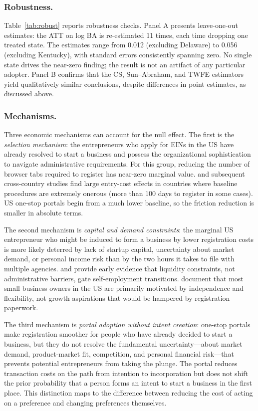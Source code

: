 \documentclass[12pt]{article}
\begin{document}
\subsubsection*{Robustness.}
Table~\ref{tab:robust} reports robustness checks. Panel A presents leave-one-out estimates: the ATT on log BA is re-estimated 11 times, each time dropping one treated state. The estimates range from 0.012 (excluding Delaware) to 0.056 (excluding Kentucky), with standard errors consistently spanning zero. No single state drives the near-zero finding; the result is not an artifact of any particular adopter. Panel B confirms that the CS, Sun--Abraham, and TWFE estimators yield qualitatively similar conclusions, despite differences in point estimates, as discussed above.




\subsubsection*{Mechanisms.}
Three economic mechanisms can account for the null effect. The first is the \textit{selection mechanism}: the entrepreneurs who apply for EINs in the US have already resolved to start a business and possess the organizational sophistication to navigate administrative requirements. For this group, reducing the number of browser tabs required to register has near-zero marginal value. \citet{djankov2002regulation} and subsequent cross-country studies find large entry-cost effects in countries where baseline procedures are extremely onerous (more than 100 days to register in some cases). US one-stop portals begin from a much lower baseline, so the friction reduction is smaller in absolute terms.

The second mechanism is \textit{capital and demand constraints}: the marginal US entrepreneur who might be induced to form a business by lower registration costs is more likely deterred by lack of startup capital, uncertainty about market demand, or personal income risk than by the two hours it takes to file with multiple agencies. \citet{evans1989} and \citet{holtz-eakin1994} provide early evidence that liquidity constraints, not administrative barriers, gate self-employment transitions. \citet{hurst2011} document that most small business owners in the US are primarily motivated by independence and flexibility, not growth aspirations that would be hampered by registration paperwork.

The third mechanism is \textit{portal adoption without intent creation}: one-stop portals make registration smoother for people who have already decided to start a business, but they do not resolve the fundamental uncertainty---about market demand, product-market fit, competition, and personal financial risk---that prevents potential entrepreneurs from taking the plunge. The portal reduces transaction costs on the path from intention to incorporation but does not shift the prior probability that a person forms an intent to start a business in the first place. This distinction maps to the difference between reducing the cost of acting on a preference and changing preferences themselves.
\end{document}
